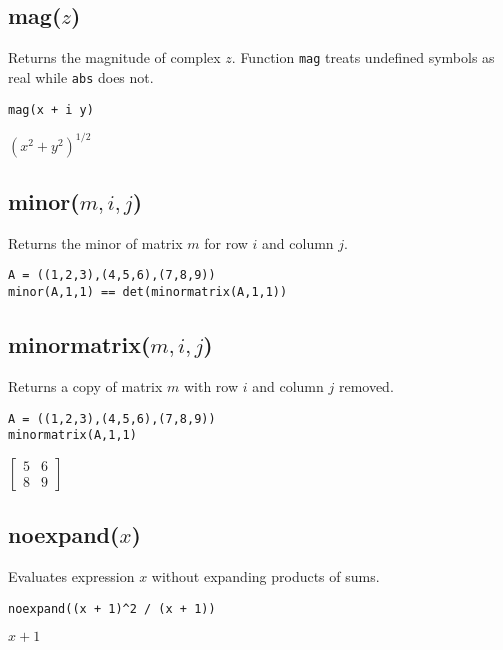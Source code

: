 \subsection*{mag($z$)}

Returns the magnitude of complex $z$.
Function {\tt mag} treats undefined symbols as real while {\tt abs} does not.

{\color{blue}
\begin{verbatim}
mag(x + i y)
\end{verbatim}
}

\noindent
$\displaystyle (x^2+y^2)^{1/2}$

\subsection*{minor($m,i,j$)}

Returns the minor of matrix $m$ for row $i$ and column $j$.

{\color{blue}
\begin{verbatim}
A = ((1,2,3),(4,5,6),(7,8,9))
minor(A,1,1) == det(minormatrix(A,1,1))
\end{verbatim}
}


\subsection*{minormatrix($m,i,j$)}

Returns a copy of matrix $m$ with row $i$ and column $j$ removed.

{\color{blue}
\begin{verbatim}
A = ((1,2,3),(4,5,6),(7,8,9))
minormatrix(A,1,1)
\end{verbatim}
}

\noindent
$\displaystyle
\begin{bmatrix}
5 & 6
\\[1ex]
8 & 9
\end{bmatrix}
$

\subsection*{noexpand($x$)}

Evaluates expression $x$ without expanding products of sums.

{\color{blue}
\begin{verbatim}
noexpand((x + 1)^2 / (x + 1))
\end{verbatim}
}

\noindent
$x + 1$


